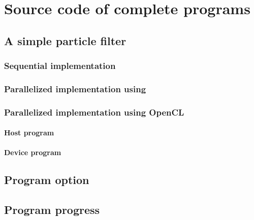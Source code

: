 \appendix

\chapter{Source code of complete programs}
\label{app:chap:Source code of complete programs}

\section{A simple particle filter}
\label{app:sec:A simle particle fitler}

\subsection{Sequential implementation}
\label{app:sub:Sequential implementation}


\subsection{Parallelized implementation using \protect\tbb}
\label{app:sub:Parallelized implementation using TBB}


\subsection{Parallelized implementation using OpenCL}
\label{app:sub:Parallelized implementation using OpenCL}

\subsubsection{Host program}
\label{app:sub:Host program}


\subsubsection{Device program}
\label{app:sub:Device program}


\section{Program option}
\label{app:sec:Program option}


\section{Program progress}
\label{app:sec:Program progress}

